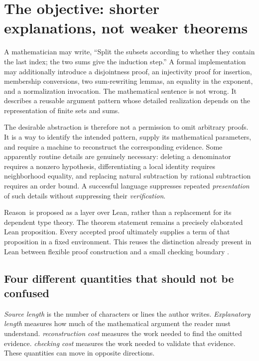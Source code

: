 \documentclass[11pt,a4paper]{article}
\newcommand{\Reason}{\textsf{Reason}}
\theoremstyle{remark}
\begin{document}
\section{The objective: shorter explanations, not weaker theorems}

A mathematician may write, ``Split the subsets according to whether they contain the last index; the two sums give the induction step.'' A formal implementation may additionally introduce a disjointness proof, an injectivity proof for insertion, membership conversions, two sum-rewriting lemmas, an equality in the exponent, and a normalization invocation. The mathematical sentence is not wrong. It describes a reusable argument pattern whose detailed realization depends on the representation of finite sets and sums.

The desirable abstraction is therefore not a permission to omit arbitrary proofs. It is a way to identify the intended pattern, supply its mathematical parameters, and require a machine to reconstruct the corresponding evidence. Some apparently routine details are genuinely necessary: deleting a denominator requires a nonzero hypothesis, differentiating a local identity requires neighborhood equality, and replacing natural subtraction by rational subtraction requires an order bound. A successful language suppresses repeated \emph{presentation} of such details without suppressing their \emph{verification}.

\Reason\ is proposed as a layer over Lean, rather than a replacement for its dependent type theory. The theorem statement remains a precisely elaborated Lean proposition. Every accepted proof ultimately supplies a term of that proposition in a fixed environment. This reuses the distinction already present in Lean between flexible proof construction and a small checking boundary \cite{lean-tactics,lean-validation}.

\subsection{Four different quantities that should not be confused}

\emph{Source length} is the number of characters or lines the author writes. \emph{Explanatory length} measures how much of the mathematical argument the reader must understand. \emph{reconstruction cost} measures the work needed to find the omitted evidence. \emph{checking cost} measures the work needed to validate that evidence. These quantities can move in opposite directions.
\end{document}
